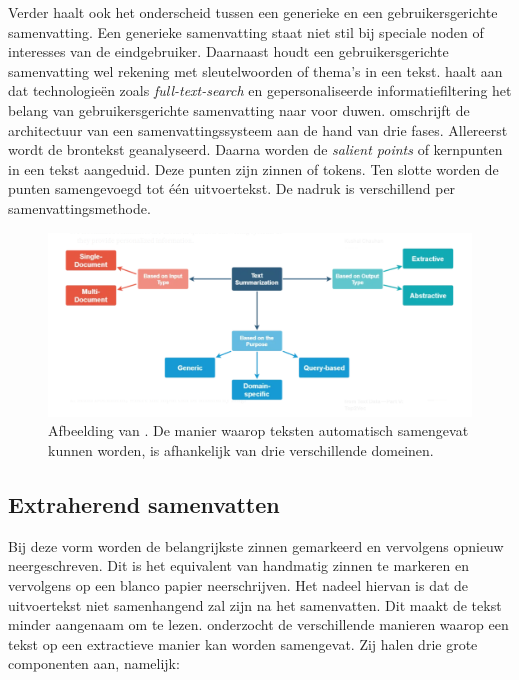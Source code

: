 Verder haalt \textcite{Hahn2000} ook het onderscheid tussen een generieke en een gebruikersgerichte samenvatting. Een generieke samenvatting staat niet stil bij speciale noden of interesses van de eindgebruiker. Daarnaast houdt een gebruikersgerichte samenvatting wel rekening met sleutelwoorden of thema's in een tekst. \textcite{Hahn2000} haalt aan dat technologieën zoals \textit{full-text-search} en gepersonaliseerde informatiefiltering het belang van gebruikersgerichte samenvatting naar voor duwen. \textcite{Hahn2000} omschrijft de architectuur van een samenvattingssysteem aan de hand van drie fases. Allereerst wordt de brontekst geanalyseerd. Daarna worden de \textit{salient points} of kernpunten in een tekst aangeduid. Deze punten zijn zinnen of tokens. Ten slotte worden de punten samengevoegd tot één uitvoertekst. De nadruk is verschillend per samenvattingsmethode.

\begin{figure}
	\includegraphics{img/summarization-mindmap.png}
	\caption{Afbeelding van \textcite{Chauchan2018}. De manier waarop teksten automatisch samengevat kunnen worden, is afhankelijk van drie verschillende domeinen.}
\end{figure}



\subsection{Extraherend samenvatten}


Bij deze vorm worden de belangrijkste zinnen gemarkeerd en vervolgens opnieuw neergeschreven.  Dit is het equivalent van handmatig zinnen te markeren en vervolgens op een blanco papier neerschrijven. Het nadeel hiervan is dat de uitvoertekst niet samenhangend zal zijn na het samenvatten. Dit maakt de tekst minder aangenaam om te lezen. \textcite{Verma2020} onderzocht de verschillende manieren waarop een tekst op een extractieve manier kan worden samengevat. Zij halen drie grote componenten aan, namelijk:


